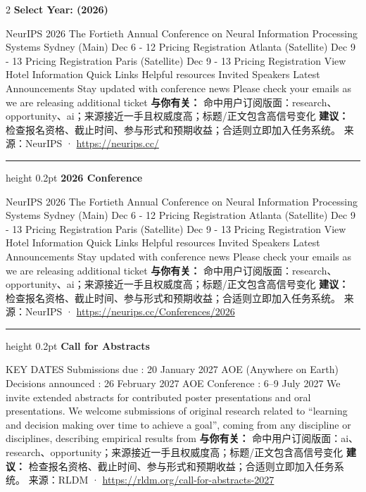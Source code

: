 \documentclass[10.5pt]{ctexart}
\begin{document}
\begin{multicols}{2}
{\large\bfseries Select Year: (2026)}\par
NeurIPS 2026 The Fortieth Annual Conference on Neural Information Processing Systems Sydney (Main) Dec 6 - 12 Pricing Registration Atlanta (Satellite) Dec 9 - 13 Pricing Registration Paris (Satellite) Dec 9 - 13 Pricing Registration View Hotel Information Quick Links Helpful resources Invited Speakers Latest Announcements Stay updated with conference news Please check your emails as we are releasing additional ticket
\textbf{与你有关：} 命中用户订阅版面：research、opportunity、ai；来源接近一手且权威度高；标题/正文包含高信号变化
\textbf{建议：} 检查报名资格、截止时间、参与形式和预期收益；合适则立即加入任务系统。
{\footnotesize\color{ormuted} 来源：NeurIPS · \url{https://neurips.cc/}}
\vspace{2mm}
\hrule height 0.2pt
\vspace{2mm}
{\large\bfseries 2026 Conference}\par
NeurIPS 2026 The Fortieth Annual Conference on Neural Information Processing Systems Sydney (Main) Dec 6 - 12 Pricing Registration Atlanta (Satellite) Dec 9 - 13 Pricing Registration Paris (Satellite) Dec 9 - 13 Pricing Registration View Hotel Information Quick Links Helpful resources Invited Speakers Latest Announcements Stay updated with conference news Please check your emails as we are releasing additional ticket
\textbf{与你有关：} 命中用户订阅版面：research、opportunity、ai；来源接近一手且权威度高；标题/正文包含高信号变化
\textbf{建议：} 检查报名资格、截止时间、参与形式和预期收益；合适则立即加入任务系统。
{\footnotesize\color{ormuted} 来源：NeurIPS · \url{https://neurips.cc/Conferences/2026}}
\vspace{2mm}
\hrule height 0.2pt
\vspace{2mm}
{\large\bfseries Call for Abstracts}\par
KEY DATES Submissions due : 20 January 2027 AOE (Anywhere on Earth) Decisions announced : 26 February 2027 AOE Conference : 6–9 July 2027 We invite extended abstracts for contributed poster presentations and oral presentations. We welcome submissions of original research related to “learning and decision making over time to achieve a goal”, coming from any discipline or disciplines, describing empirical results from 
\textbf{与你有关：} 命中用户订阅版面：ai、research、opportunity；来源接近一手且权威度高；标题/正文包含高信号变化
\textbf{建议：} 检查报名资格、截止时间、参与形式和预期收益；合适则立即加入任务系统。
{\footnotesize\color{ormuted} 来源：RLDM · \url{https://rldm.org/call-for-abstracts-2027}}

\end{multicols}
\end{document}
